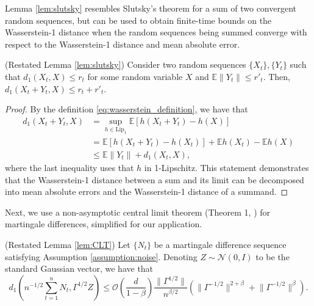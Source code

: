 Lemma \ref{lem:slutsky} resembles Slutsky's theorem for a sum of two convergent random sequences, but can be used to obtain finite-time bounds on the Wasserstein-1 distance when the random sequences being summed converge with respect to the Wasserstein-1 distance and mean absolute error. 
\begin{lemma*}
    (Restated Lemma \ref{lem:slutsky})
    Consider two random sequences $\{X_t\}, \{Y_t\}$ such that $d_1 (X_t, X) \leq r_t$ for some random variable $X$ and $\mathbb{E}\lVert Y_t \rVert \leq r'_t$.
    Then, $d_1 (X_t + Y_t, X) \leq r_t + r'_t$.
\end{lemma*}
\begin{proof}
    By the definition \eqref{eq:wasserstein_definition}, we have that
    \begin{align*}
        d_1 (X_t + Y_t, X) &= \sup_{h \in \mathrm{Lip}_1} \mathbb{E}[h(X_t + Y_t) - h(X)] 
        \\ 
        &= \mathbb{E}\left[h(X_t + Y_t) - h(X_t)\right] + \mathbb{E}h(X_t) - \mathbb{E} h(X) 
        \\ & \leq 
        \mathbb{E}\lVert Y_t \rVert + d_1 (X_t, X) 
        ,
    \end{align*}
    where the last inequality uses that $h$ in 1-Lipschitz. 
    This statement demonstrates that the Wasserstein-1 distance between a sum and its limit can be decomposed into mean absolute errors and the Wasserstein-1 distance of a summand. 
\end{proof}
Next, we use a non-asymptotic central limit theorem (Theorem 1, \citet{srikant2024CLT}) for martingale differences, simplified for our application.
\begin{lemma*}
    (Restated Lemma \ref{lem:CLT})
    Let $\{N_t\}$ be a martingale difference sequence satisfying Assumption \ref{assumption:noise}. 
    Denoting $Z \sim \mathcal{N}(0, I)$ to be the standard Gaussian vector, we have that
    \begin{equation}
        d_1 \left(n^{-1/2} \sum_{t=1}^n N_t, \Gamma^{1/2} Z\right) \leq 
        \mathcal{O}\left(\frac{d}{1-\beta}\right) \frac{\lVert \Gamma^{1/2} \rVert }{n^{\beta / 2}} \left(\lVert \Gamma^{-1/2} \rVert^{2 + \beta} + \lVert \Gamma^{-1/2} \rVert^\beta \right).
    \end{equation}
\end{lemma*}
